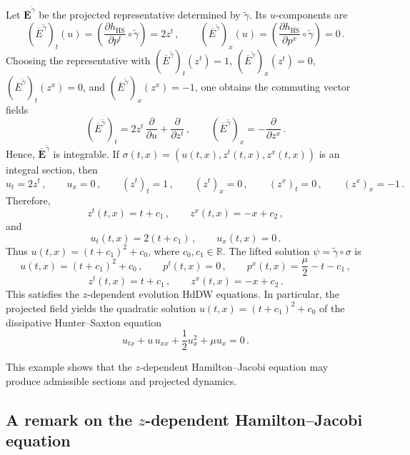\documentclass[11pt,twoside]{article}
\theoremstyle{plain}
\theoremstyle{definition}
\theoremstyle{remark}
\begin{document}
Let $\overline{\bm E}^{\widetilde{\gamma}}$ be the projected representative determined by $\widetilde{\gamma}$. Its $u$-components are
\[
(\overline{E}^{\widetilde{\gamma}})_t(u)=\left(\frac{\partial h_{\mathrm{HS}}}{\partial p^t}\circ\widetilde{\gamma}\right)=2z^t\,,\qquad
(\overline{E}^{\widetilde{\gamma}})_x(u)=\left(\frac{\partial h_{\mathrm{HS}}}{\partial p^x}\circ\widetilde{\gamma}\right)=0\,.
\]
Choosing the representative with $(\overline{E}^{\widetilde{\gamma}})_t(z^t)=1$, $(\overline{E}^{\widetilde{\gamma}})_x(z^t)=0$, $(\overline{E}^{\widetilde{\gamma}})_t(z^x)=0$, and $(\overline{E}^{\widetilde{\gamma}})_x(z^x)=-1$, one obtains the commuting vector fields
\[
(\overline{E}^{\widetilde{\gamma}})_t=2z^t\,\frac{\partial}{\partial u}+\frac{\partial}{\partial z^t}\,,
\qquad
(\overline{E}^{\widetilde{\gamma}})_x=-\frac{\partial}{\partial z^x}\,.
\]
Hence, $\overline{{\bm E}}^{\widetilde{\gamma}}$ is integrable. If $\sigma(t,x)=(u(t,x),z^t(t,x),z^x(t,x))$ is an integral section, then
\[
u_t=2z^t\,,\qquad u_x=0\,,\qquad (z^t)_t=1\,,\qquad (z^t)_x=0\,,\qquad (z^x)_t=0\,,\qquad (z^x)_x=-1\,.
\]
Therefore,
\[
z^t(t,x)=t+c_1\,,\qquad z^x(t,x)=-x+c_2\,,
\]
and
\[
u_t(t,x)=2(t+c_1)\,,\qquad u_x(t,x)=0\,.
\]
Thus
\(
u(t,x)=(t+c_1)^2+c_0
\),
 where $c_0,c_1\in\mathbb{R}$. The lifted solution $\psi=\widetilde{\gamma}\circ\sigma$ is
\[
u(t,x)=(t+c_1)^2+c_0\,,\qquad p^t(t,x)=0\,,\qquad p^x(t,x)=\frac{\mu}{2}-t-c_1\,,
\]
\[
z^t(t,x)=t+c_1\,,\qquad z^x(t,x)=-x+c_2\,.
\]
This satisfies the $z$-dependent evolution HdDW equations. In particular, the projected field yields the quadratic solution
\(
u(t,x)=(t+c_1)^2+c_0
\)
of the dissipative Hunter--Saxton equation
\[
u_{tx}+u\,u_{xx}+\frac12 u_x^2+\mu u_x=0\,.
\]

This example shows that the $z$-dependent Hamilton--Jacobi equation may produce admissible sections and projected dynamics.

\subsection{A remark on the \texorpdfstring{$z$}{}-dependent Hamilton--Jacobi equation}
\end{document}
